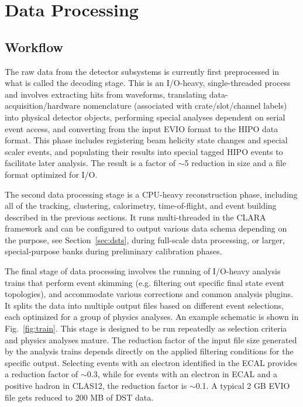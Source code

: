 \section{Data Processing}
\label{sec:dataproc}

\subsection{Workflow}

The raw data from the detector subsystems is currently first preprocessed in what is called the decoding
stage. This is an I/O-heavy, single-threaded process and involves extracting hits from waveforms, translating
data-acquisition/hardware nomenclature (associated with crate/slot/channel labels) into physical detector objects,
performing special analyses dependent on serial event access, and converting from the input EVIO format to the
HIPO data format.  This phase includes registering beam helicity state changes and special scaler events, and
populating their results into special tagged HIPO events to facilitate later analysis.  The result is a factor of
$\sim$5 reduction in size and a file format optimized for I/O.

The second data processing stage is a CPU-heavy reconstruction phase, including all of the tracking, clustering,
calorimetry, time-of-flight, and event building described in the previous sections.  It runs multi-threaded in the CLARA
framework and can be configured to output various data schema depending on the purpose, see
Section~\ref{sec:dsts}, during full-scale data processing, or larger, special-purpose banks during preliminary
calibration phases.

The final stage of data processing involves the running of I/O-heavy analysis trains that perform event skimming
(e.g. filtering out specific final state event topologies),  and accommodate various corrections and common analysis
plugins.  It splits the data into multiple output files based on different event selections, each optimized for a
group of physics analyses. An example schematic is shown in Fig.~\ref{fig:train}. This stage is designed to be run
repeatedly as selection criteria and physics analyses mature. The reduction factor of the input file size generated
by the analysis trains depends directly on the applied filtering conditions for the specific output. Selecting events
with an electron identified in the ECAL provides a reduction factor of $\sim$0.3, while for events with an electron
in ECAL and a positive hadron in CLAS12, the reduction factor is $\sim$0.1.  A typical 2 GB EVIO file gets reduced to 200 MB of DST data. 

